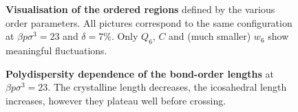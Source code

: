 \documentclass[twocolumn,superscriptaddress]{revtex4-1}
\begin{document}
\begin{figure}
	\caption{\textbf{Visualisation of the ordered regions} defined by the various order parameters. All pictures correspond to the same configuration at $\beta p\sigma^3=23$ and $\delta=7\%$. Only $Q_6$, $C$ and (much smaller) $w_6$ show meaningful fluctuations.}
	\label{fig:3D}
\end{figure}

\tikzset{external/force remake=false}
\begin{figure}
	\caption{\textbf{Polydispersity dependence of the bond-order lengths} at $\beta p\sigma^3=23$. The crystalline length decreases, the icosahedral length increases, however they plateau well before crossing.}
	\label{fig:lengthpoly}
\end{figure}
\end{document}
